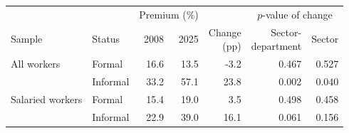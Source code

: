 \begin{tabular}{@{}llrrrrr@{}}
\toprule
    & & \multicolumn{2}{c}{Premium (\%)} & & \multicolumn{2}{c}{$p$-value of change} \\
    \cmidrule(lr){3-4}\cmidrule(lr){6-7}
    Sample & Status & 2008 & 2025 & \shortstack{Change\\(pp)} & \shortstack{Sector-\\department} & Sector \\
    \midrule
All workers & Formal & 16.6 & 13.5 & -3.2 & 0.467 & 0.527 \\
& Informal & 33.2 & 57.1 & 23.8 & 0.002 & 0.040 \\
\midrule
    Salaried workers & Formal & 15.4 & 19.0 & 3.5 & 0.498 & 0.458 \\
& Informal & 22.9 & 39.0 & 16.1 & 0.061 & 0.156\\
\bottomrule\end{tabular}
